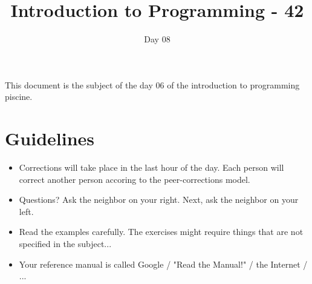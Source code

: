 \documentclass{42-en}
\begin{document}
\title{Introduction to Programming - 42}
\subtitle{Day 08}


\summary
{
This document is the subject of the day 06 of the introduction to programming piscine.
}

\maketitle

\tableofcontents



\chapter{Guidelines}

\begin{itemize}

  \item Corrections will take place in the last hour of the day. Each person will correct another person accoring to the peer-corrections model.
 
  \item Questions? Ask the neighbor on your right. Next, ask the neighbor on your left.
  
  \item Read the examples carefully. The exercises might require things that are not specified in the subject...

  \item Your reference manual is called Google / "Read the Manual!" / the Internet / ...

\end{itemize}

\newpage


\end{document}
